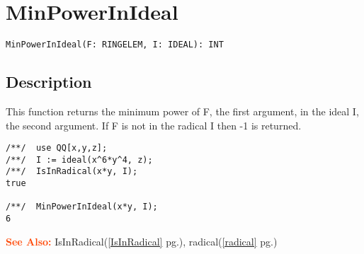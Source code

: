 \documentclass[a4paper]{mybook}
\newenvironment{command}{}{} %
\newcommand\SeeAlso{\par\textcolor{OrangeRed}{\textbf{\large See Also: }}}
\begin{document}
\section{MinPowerInIdeal}
\label{MinPowerInIdeal}
\begin{command} %


\begin{Verbatim}[label=syntax, rulecolor=\color{MidnightBlue},
frame=single]
MinPowerInIdeal(F: RINGELEM, I: IDEAL): INT
\end{Verbatim}


\subsection*{Description}

This function returns the minimum power of F, the first argument, in
the ideal I, the second argument.
If F is not in the radical I then -1 is returned.
\begin{Verbatim}[label=example, rulecolor=\color{PineGreen}, frame=single]
/**/  use QQ[x,y,z];
/**/  I := ideal(x^6*y^4, z);
/**/  IsInRadical(x*y, I);
true

/**/  MinPowerInIdeal(x*y, I);
6
\end{Verbatim}


\SeeAlso %
  IsInRadical(\ref{IsInRadical} pg.\pageref{IsInRadical}), 
    radical(\ref{radical} pg.\pageref{radical})
\end{command} %
\end{document}
